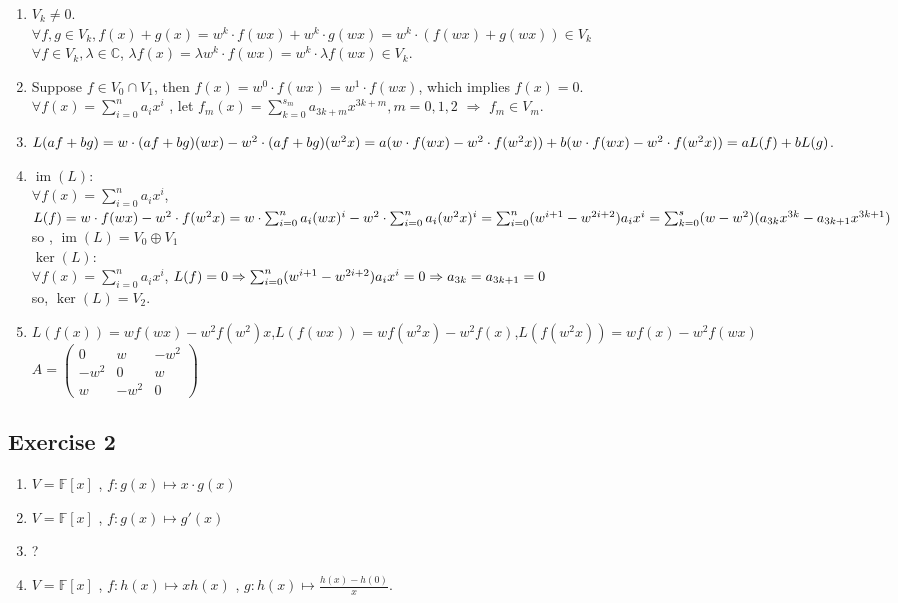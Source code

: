 \documentclass[11pt]{ctexart}
\theoremstyle{definition}
\numberwithin{equation}{section}
\newcommand{\op}[1]{\operatorname{#1}}%
\newcommand{\FF}{\mathbb{F}}%
\newcommand{\CC}{\mathbb{C}}
\theoremstyle{definition}
\theoremstyle{remark}
\begin{document}
\begin{aaa}
    \begin{enumerate}
        \item $V_k\neq 0$.\\$\forall f,g \in V_k,f(x)+g(x)=w^k\cdot f(wx)+w^k\cdot g(wx)=w^k\cdot(f(wx)+g(wx))\in V_k$\\$\forall f\in V_k , \lambda \in \CC$, $\lambda f(x)=\lambda w^k \cdot f(wx)=w^k \cdot \lambda f(wx)\in V_k$.
        \item Suppose $f\in V_0\cap V_1$, then $f(x)=w^0\cdot f(wx)=w^1\cdot f(wx)$, which implies $f(x)=0$. \\$\forall f(x)=\sum_{i=0}^n a_ix^i$ , let $f_m(x)=\sum_{k=0}^{s_m}a_{3k+m}x^{3k+m},m=0,1,2$ $\Rightarrow$ $f_m\in V_m$.
        \item $L(af+bg)\\=w\cdot (af+bg)(wx)-w^2\cdot (af+bg)(w^2x)\\=a(w\cdot f(wx)-w^2\cdot f(w^2x))+b(w\cdot f(wx)-w^2\cdot f(w^2x))\\=aL(f)+bL(g)$.
        \item $\op{im} (L)$:\\$\forall f(x)=\sum_{i=0}^n a_ix^i$, $L(f)=w\cdot f(wx)-w^2\cdot f(w^2x)\\=w\cdot \sum_{i=0}^n a_i(wx)^i-w^2\cdot \sum_{i=0}^n a_i(w^2x)^i\\=\sum_{i=0}^{n}(w^{i+1}-w^{2i+2})a_ix^i\\=\sum_{k=0}^{s}(w-w^2)(a_{3k}x^{3k}-a_{3k+1}x^{3k+1})$\\so , $\op{im}(L)=V_0\oplus V_1$\\$\ker(L)$:\\$\forall f(x)=\sum_{i=0}^n a_ix^i$, $L(f)=0\\ \Rightarrow \sum_{i=0}^{n}(w^{i+1}-w^{2i+2})a_ix^i=0\\ \Rightarrow a_{3k}=a_{3k+1}=0$\\so, $\ker(L)=V_2$.
        \item $L(f(x))=wf(wx)-w^2f(w^2)x$,\quad $L(f(wx))=wf(w^2x)-w^2f(x)$,\quad $L(f(w^2x))=wf(x)-w^2f(wx)$\\$A=\begin{pmatrix}
            0 & w & -w^2\\
            -w^2 & 0 & w\\
            w & -w^2 & 0
        \end{pmatrix}$
    \end{enumerate}
\end{aaa}
\subsection{Exercise 2}
\begin{aaa}
    \begin{enumerate}
        \item $V=\FF[x]$ , $f: g(x)\mapsto x\cdot g(x)$
        \item $V=\FF[x]$ , $f: g(x)\mapsto g'(x)$
        \item ?
        \item $V=\FF[x]$ , $f: h(x)\mapsto xh(x)$ , $g: h(x) \mapsto \frac{h(x)-h(0)}{x}$.
    \end{enumerate}
\end{aaa}
\end{document}

